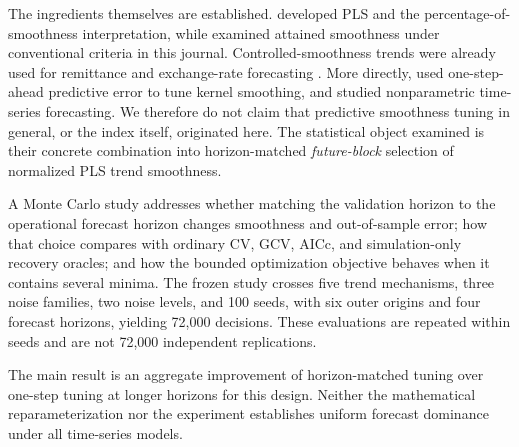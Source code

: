The ingredients themselves are established.
\citet{guerrero2007penalized,guerrero2008smoothness}
developed PLS and the percentage-of-smoothness
interpretation, while \citet{cortes2017smoothness}
examined attained smoothness under conventional
criteria in this journal. Controlled-smoothness
trends were already used for remittance and
exchange-rate forecasting
\citep{islas2019remittances,islas2025exchange}.
More directly, \citet{hart1994tscv} used
one-step-ahead predictive error to tune kernel
smoothing, and \citet{vilar2007nonparametric}
studied nonparametric time-series forecasting.
We therefore do not claim that predictive
smoothness tuning in general, or the index
itself, originated here. The statistical
object examined is their concrete combination
into horizon-matched \emph{future-block}
selection of normalized PLS trend smoothness.

A Monte Carlo study addresses whether matching
the validation horizon to the operational
forecast horizon changes smoothness and
out-of-sample error; how that choice compares
with ordinary CV, GCV, AICc, and
simulation-only recovery oracles; and how
the bounded optimization objective behaves
when it contains several minima. The frozen
study crosses five trend mechanisms, three
noise families, two noise levels, and 100
seeds, with six outer origins and four
forecast horizons, yielding 72,000 decisions.
These evaluations are repeated within seeds
and are not 72,000 independent replications.

The main result is an aggregate improvement
of horizon-matched tuning over one-step
tuning at longer horizons for this design.
Neither the mathematical reparameterization
nor the experiment establishes uniform
forecast dominance under all time-series
models. 